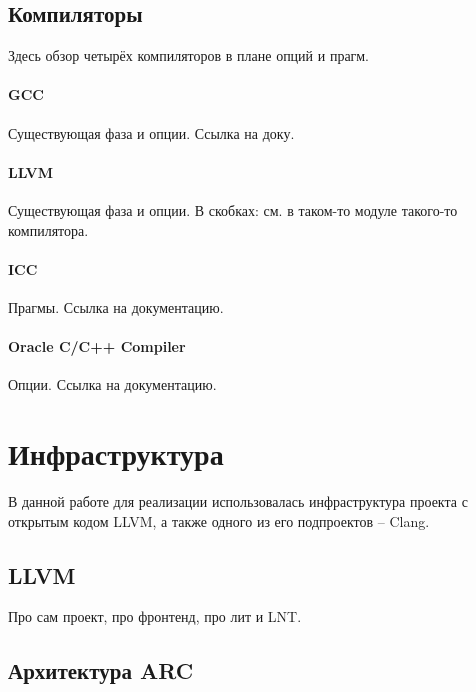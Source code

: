 \documentclass[12pt,a4paper]{article}
\begin{document}
\subsection{Компиляторы}

Здесь обзор четырёх компиляторов в плане опций и прагм.

\paragraph{GCC}

Существующая фаза и опции. Ссылка на доку.

\paragraph{LLVM}

Существующая фаза и опции. В скобках: см. в таком-то модуле такого-то компилятора.

\paragraph{ICC}

Прагмы. Ссылка на документацию.

\paragraph{Oracle C/C++ Compiler}

Опции. Ссылка на документацию.

\section{Инфраструктура}

В данной работе для реализации использовалась инфраструктура проекта с открытым кодом LLVM, а также одного из его подпроектов -- Clang.

\subsection{LLVM}

Про сам проект, про фронтенд, про лит и LNT.

\subsection{Архитектура ARC}
\end{document}

